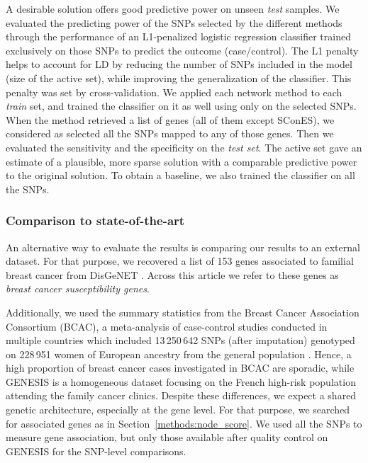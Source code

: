 \documentclass[twocolumn, 11pt]{article}
\begin{document}
A desirable solution offers good predictive power on unseen \emph{test} samples. We evaluated the predicting power of the SNPs selected by the different methods through the performance of an L1-penalized logistic regression classifier trained exclusively on those SNPs to predict the outcome (case/control). The L1 penalty helps to account for LD by reducing the number of SNPs included in the model (size of the active set), while improving the generalization of the classifier. This penalty was set by cross-validation. We applied each network method to each \emph{train} set, and trained the classifier on it as well using only on the selected SNPs. When the method retrieved a list of genes (all of them except SConES), we considered as selected all the SNPs mapped to any of those genes. Then we evaluated the sensitivity and the specificity on the \emph{test set}. The active set gave an estimate of a plausible, more sparse solution with a comparable predictive power to the original solution. To obtain a baseline, we also trained the classifier on all the SNPs. 

\subsubsection{Comparison to state-of-the-art}
\label{methods:bcac}

An alternative way to evaluate the results is comparing our results to an external dataset. For that purpose, we recovered a list of 153 genes associated to familial breast cancer from DisGeNET \cite{pinero_disgenet:_2017}. Across this article we refer to these genes as \emph{breast cancer susceptibility genes}.

Additionally, we used the summary statistics from the Breast Cancer Association Consortium (BCAC), a meta-analysis of case-control studies conducted in multiple countries which included 13\,250\,642 SNPs (after imputation) genotyped on 228\,951 women of European ancestry from the general population \cite{Michailidou2017}. Hence, a high proportion of breast cancer cases investigated in BCAC are sporadic, while GENESIS is a homogeneous dataset focusing on the French high-risk population attending the family cancer clinics. Despite these differences, we expect a shared genetic architecture, especially at the gene level. For that purpose, we searched for associated genes as in Section~\ref{methods:node_score}. We used all the SNPs to measure gene association, but only those available after quality control on GENESIS for the SNP-level comparisons.
\end{document}
